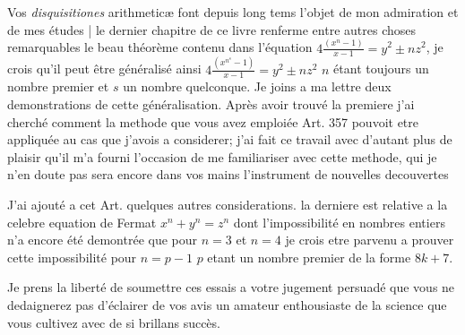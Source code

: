 \documentclass[11pt,a4paper]{article}
\begin{document}
Vos \emph{disquisitiones} arithmeticæ font depuis long tems l'objet de mon
admiration et de mes études | le dernier chapitre de ce livre renferme entre
autres choses remarquables le beau théorème contenu dans l'équation
$4\frac{(x^n - 1)}{x - 1} = y^2 \pm n z^2$, je crois qu'il peut être
généralisé ainsi $4\frac{(x^{n^s} - 1)}{x - 1} = y^2 \pm n z^2$ $n$ étant
toujours un nombre premier et $s$ un nombre quelconque. Je joins a ma lettre
deux demonstrations de cette généralisation. Après avoir trouvé la premiere
j'ai cherché comment la methode que vous avez emploiée Art. 357 pouvoit etre
appliquée au cas que j'avois a considerer; j'ai fait ce travail avec d'autant
plus de plaisir qu'il m'a fourni l'occasion de me familiariser avec cette
methode, qui je n'en doute pas sera encore dans vos mains l'instrument de
nouvelles decouvertes




J'ai ajouté a cet Art. quelques autres considerations. la derniere est
relative a la celebre equation de Fermat $x^n + y^n = z^n$ dont
l'impossibilité en nombres entiers n'a encore été demontrée que pour $n = 3$
et $n = 4$ je crois etre parvenu a prouver cette impossibilité pour
$n = p - 1$ $p$ etant un nombre premier de la forme $8k + 7$.

Je prens la liberté de soumettre \struck{\ill{}} ces essais a votre jugement
persuadé que vous ne dedaignerez pas d'éclairer de vos avis un amateur
enthousiaste de la science que vous cultivez avec de si brillans succès.
\end{document}

